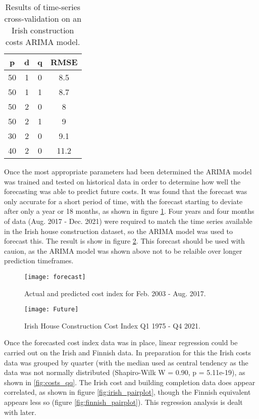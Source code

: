 \documentclass[hidelinks,12pt,oneside]{report} %
\begin{document}
\begin{table}[h!]
\centering
\begin{tabular}{||c | c | c | c ||} 
 \hline
 p & d & q & RMSE \\ [0.0ex] 
 \hline\hline
 50 & 1 & 0 & 8.5 \\ 
 \hline
 50 & 1 & 1 & 8.7 \\
 \hline
 50 & 2 & 0 & 8 \\
 \hline
  50 & 2 & 1 & 9 \\
  \hline
  30 & 2 & 0 & 9.1 \\
  \hline
  40 & 2 & 0 & 11.2 \\ [0.0ex] 
 \hline
\end{tabular}
\caption{Results of time-series cross-validation on an Irish construction costs ARIMA model.}
\label{table:1}
\end{table}

Once the most appropriate parameters had been determined the ARIMA model was trained and tested on historical data in order to determine how well the forecasting was able to predict future costs. It was found that the forecast was only accurate for a short period of time, with the forecast starting to deviate after only a year or 18 months, as shown in figure \ref{fig:forecast}. Four years and four months of data (Aug. 2017 - Dec. 2021) were required to match the time series available in the Irish house construction dataset, so the ARIMA model was used to forecast this. The result is show in figure \ref{fig:future}. This forecast should be used with cauion, as the ARIMA model was shown above not to be relaible over longer prediction timeframes.

\begin{figure}[!ht]
	\centering
	\vspace{.4218cm}
		\texttt{[image: forecast]}	\captionsetup{justification=justified,width=1\linewidth}
	\caption{Actual and predicted cost index for Feb. 2003 - Aug. 2017.}
\label{fig:forecast}
\end{figure}

\begin{figure}[!ht]
	\centering
	\vspace{.4218cm}
		\texttt{[image: Future]}	\captionsetup{justification=justified,width=1\linewidth}
	\caption{Irish House Construction Cost Index Q1 1975 - Q4 2021.}
\label{fig:future}
\end{figure}

Once the forecasted cost index data was in place, linear regression could be carried out on the Irish and Finnish data. In preparation for this the Irish costs data was grouped by quarter (with the median used as central tendency as the data was not normally distributed (Shapiro-Wilk W = 0.90, p = 5.11e-19), as shown in \ref{fig:costs_qq}. The Irish cost and building completion data does appear correlated, as shown in figure \ref{fig:irish_pairplot}, though the Finnish equivalent appears less so (figure \ref{fig:finnish_pairplot}). This regression analysis is dealt with later.
\end{document}
